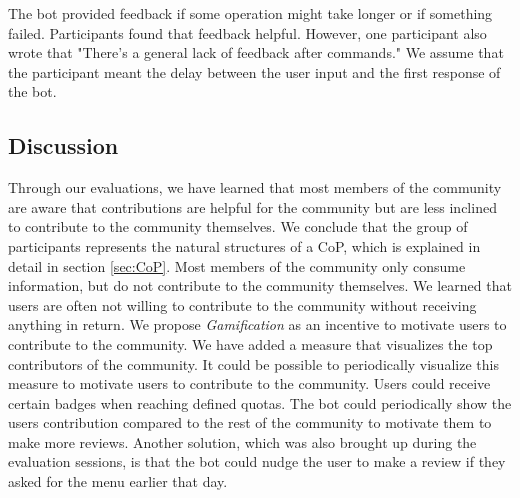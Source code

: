 The bot provided feedback if some operation might take longer or if something failed. Participants found that feedback helpful. However, one participant also wrote that "There's a general lack of feedback after commands." We assume that the participant meant the delay between the user input and the first response of the bot.  

\subsection{Discussion}
Through our evaluations, we have learned that most members of the community are aware that contributions are helpful for the community but are less inclined to contribute to the community themselves. 
We conclude that the group of participants represents the natural structures of a CoP, which is explained in detail in section \ref{sec:CoP}. Most members of the community only consume information, but do not contribute to the community themselves. We learned that users are often not willing to contribute to the community without receiving anything in return. We propose \emph{Gamification } as an incentive to motivate users to contribute to the community.
We have added a measure that visualizes the top contributors of the community. It could be possible to periodically visualize this measure to motivate users to contribute to the community.
Users could receive certain badges when reaching defined quotas. The bot could periodically show the users contribution compared to the rest of the community to motivate them to make more reviews.
Another solution, which was also brought up during the evaluation sessions, is that the bot could nudge the user to make a review if they asked for the menu earlier that day.